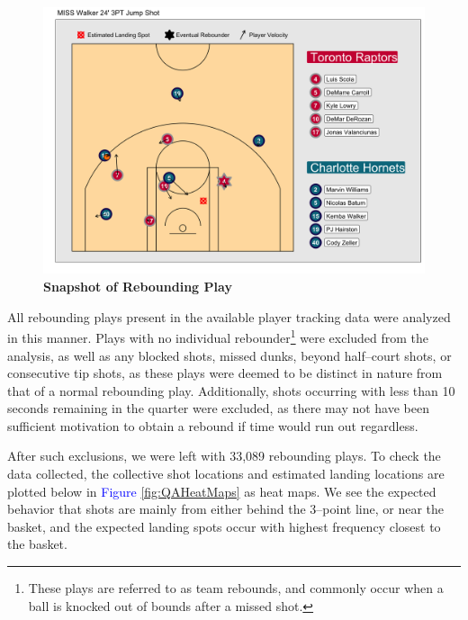 \documentclass{article}
\begin{document}
\begin{figure}[htb]
\centering
\includegraphics[width=1\columnwidth]{ReboundExNoProbs.png}
\caption{\bf{Snapshot of Rebounding Play}}
\label{fig:ReboundExNoProbs}
\end{figure}

\noindent
All rebounding plays present in the available player tracking data were analyzed in this manner. Plays with no individual rebounder\footnote{These plays are referred to as team rebounds, and commonly occur when a ball is knocked out of bounds after a missed shot.} were excluded from the analysis, as well as any blocked shots, missed dunks, beyond half--court shots, or consecutive tip shots, as these plays were deemed to be distinct in nature from that of a normal rebounding play. Additionally, shots occurring with less than 10 seconds remaining in the quarter were excluded, as there may not have been sufficient motivation to obtain a rebound if time would run out regardless. 

\noindent
After such exclusions, we were left with 33,089 rebounding plays. To check the data collected, the collective shot locations and estimated landing locations are plotted below in \textcolor{blue}{Figure} \ref{fig:QAHeatMaps} as heat maps. We see the expected behavior that shots are mainly from either behind the 3--point line, or near the basket, and the expected landing spots occur with highest frequency closest to the basket.
\end{document}
